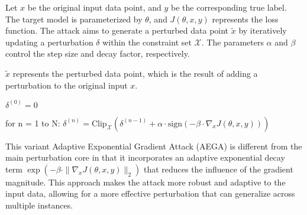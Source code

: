 Let $x$ be the original input data point, and $y$ be the corresponding true label. The target model is parameterized by $\theta$, and $J(\theta, x, y)$ represents the loss function. The attack aims to generate a perturbed data point $\tilde{x}$ by iteratively updating a perturbation $\delta$ within the constraint set $\mathcal{X}$. The parameters $\alpha$ and $\beta$ control the step size and decay factor, respectively.


$\tilde{x}$ represents the perturbed data point, which is the result of adding a perturbation to the original input $x$.

$\delta^{(0)} = 0$

for n = 1 to N:
$\delta^{(n)} = \text{Clip}_{\mathcal{X}} \left( \delta^{(n-1)} + \alpha \cdot \text{sign} \left( -\beta \cdot \nabla_x J(\theta, x, y) \right) \right)$

This variant Adaptive Exponential Gradient Attack (AEGA) is different from the main perturbation core in that it incorporates an adaptive exponential decay term $\exp(-\beta \cdot \| \nabla_x J(\theta, x, y) \|_2)$ that reduces the influence of the gradient magnitude. This approach makes the attack more robust and adaptive to the input data, allowing for a more effective perturbation that can generalize across multiple instances.